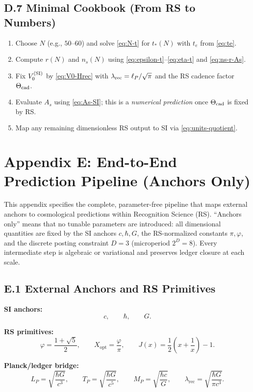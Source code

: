 \documentclass[11pt]{article}
\theoremstyle{definition}
\theoremstyle{remark}
\begin{document}
\subsection*{D.7 Minimal Cookbook (From RS to Numbers)}
\begin{enumerate}
\item Choose $N$ (e.g., $50$--$60$) and solve \eqref{eq:N-t} for $t_*(N)$ with $t_e$ from \eqref{eq:te}.
\item Compute $r(N)$ and $n_s(N)$ using \eqref{eq:epsilon-t}--\eqref{eq:eta-t} and \eqref{eq:ns-r-As}.
\item Fix $V_0^{\rm (SI)}$ by \eqref{eq:V0-Hrec} with $\lambda_{\rm rec}=\ell_P/\sqrt{\pi}$ and the RS cadence factor $\Theta_{\rm cad}$.
\item Evaluate $A_s$ using \eqref{eq:As-SI}; this is a \emph{numerical prediction} once $\Theta_{\rm cad}$ is fixed by RS.
\item Map any remaining dimensionless RS output to SI via \eqref{eq:units-quotient}.
\end{enumerate}


\section*{Appendix E: End-to-End Prediction Pipeline (Anchors Only)}

\noindent
This appendix specifies the complete, parameter-free pipeline that maps external anchors to cosmological predictions within Recognition Science (RS). ``Anchors only'' means that no tunable parameters are introduced: all dimensional quantities are fixed by the SI anchors \(c,\hbar,G\), the RS-normalized constants \(\pi,\varphi\), and the discrete posting constraint \(D=3\) (microperiod \(2^D=8\)). Every intermediate step is algebraic or variational and preserves ledger closure at each scale.

\subsection*{E.1 External Anchors and RS Primitives}

\noindent
\textbf{SI anchors:}
\[
c,\qquad \hbar,\qquad G.
\]

\noindent
\textbf{RS primitives:}
\[
\varphi=\frac{1+\sqrt{5}}{2},\qquad X_{\mathrm{opt}}=\frac{\varphi}{\pi},\qquad J(x)=\frac12\!\left(x+\frac1x\right)-1.
\]

\noindent
\textbf{Planck/ledger bridge:}
\[
L_P=\sqrt{\frac{\hbar G}{c^3}},\qquad T_P=\sqrt{\frac{\hbar G}{c^5}},\qquad M_P=\sqrt{\frac{\hbar c}{G}},\qquad 
\lambda_{\mathrm{rec}}=\sqrt{\frac{\hbar G}{\pi c^3}}.
\]
\end{document}
